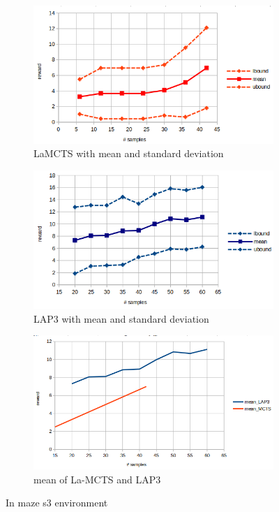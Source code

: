 \documentclass[bibliography=totoc]{scrartcl}
\begin{document}
\begin{figure}[h!]
	\centering
	\begin{subfigure}[b]{0.3\linewidth}
		\includegraphics[width=\linewidth]{img/la-mcts.png}
        \caption{LaMCTS with mean and standard deviation}	
    \end{subfigure}
	\hspace{0.02\textwidth}
	\begin{subfigure}[b]{0.3\linewidth}
		\includegraphics[width=\linewidth]{img/LAP3.png}
		\caption{LAP3 with mean and standard deviation}
	\end{subfigure}
	\hspace{0.02\textwidth}
	\begin{subfigure}[b]{0.3\linewidth}
		\includegraphics[width=\linewidth]{img/comparison.png}
        \caption{mean of La-MCTS and LAP3}
	\end{subfigure}
	\caption{In maze s3 environment}
	\label{fig:known_problems}
\end{figure}
\end{document}
